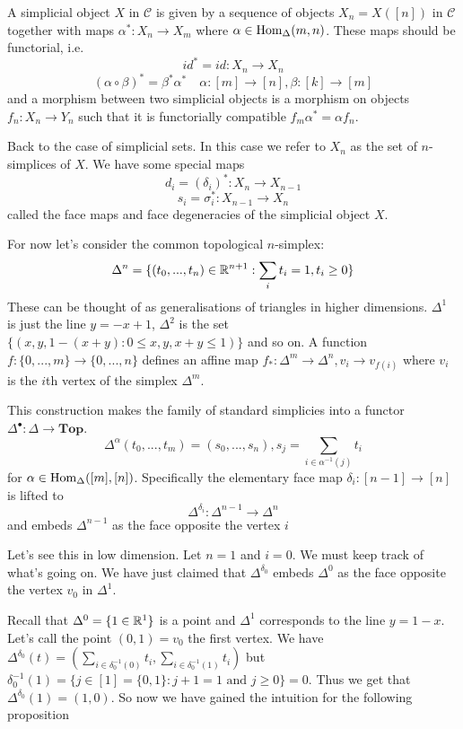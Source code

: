 A simplicial object $X$ in $\mathcal{C}$ is given by a sequence of objects $X_n = X([n])$ in $\mathcal{C}$ together with maps $\alpha^*: X_n \to X_m$ where $\alpha \in \text{Hom}_\Delta(m, n)$. These maps should be functorial, i.e. 
\[id^* = id : X_n \to X_n\]
\[(\alpha \circ \beta)^* = \beta^* \alpha^*\quad \alpha: [m]\to [n], \beta: [k]\to [m]\]
and a morphism between two simplicial objects is a morphism on objects $f_n: X_n \to Y_n$ such that it is functorially compatible $f_m \alpha^* = \alpha f_n$. 

Back to the case of simplicial sets. In this case we refer to $X_n$ as the set of $n$-simplices of $X$. We have some special maps
\[d_i = (\delta_i)^*: X_n\to X_{n-1}\]
\[s_i = \sigma_i^*: X_{n-1}\to X_n\]
called the face maps and face degeneracies of the simplicial object $X$. 

For now let's consider the common topological $n$-simplex:
\[\Delta^n = \{(t_0,...,t_n)\in \mathbb{R}^{n+1}: \sum_it_i = 1, t_i \geq 0\}\]
These can be thought of as generalisations of triangles in higher dimensions. $\Delta^1$ is just the line $y = -x + 1$, $\Delta^2$ is the set $\{(x,y,1 - (x + y): 0\leq x,y, x + y \leq 1)\}$ and so on. A function $f: \{0,...,m\}\to \{0,...,n\}$ defines an affine map $f_*: \Delta^m \to \Delta^n, v_i \to v_{f(i)}$ where $v_i$ is the $i$th vertex of the simplex $\Delta^m$. 

This construction makes the family of standard simplicies into a functor $\Delta^\bullet: \Delta \to \textbf{Top}$.
\[\Delta^\alpha(t_0,...,t_m) = (s_0,...,s_n), s_j = \sum_{i \in \alpha^{-1}(j)}t_i\]
for $\alpha\in \text{Hom}_{\Delta}([m], [n])$. Specifically the elementary face map $\delta_i: [n-1]\to[n]$ is lifted to
\[\Delta^{\delta_i}: \Delta^{n-1}\to \Delta^n\]
and embeds $\Delta^{n-1}$ as the face opposite the vertex $i$ 

Let's see this in low dimension. Let $n = 1$ and $i= 0$. We must keep track of what's going on. We have just claimed that $\Delta^{\delta_0}$ embeds $\Delta^0$ as the face opposite the vertex $v_0$ in $\Delta^1$.

Recall that $\Delta^0 = \{1 \in \mathbb{R}^1\}$ is a point and $\Delta^1$ corresponds to the line $y = 1 - x$. Let's call the point $(0,1) = v_0$ the first vertex. We have $\Delta^{\delta_0} (t) = (\sum_{i \in \delta_0^{-1}(0)}t_i,\sum_{i \in \delta_0^{-1}(1)}t_i)$ but $\delta_0^{-1}(1) = \{j \in [1] = \{0,1\}: j + 1 = 1 \text{ and } j \geq 0\} = 0$. Thus we get that $\Delta^{\delta_0} (1) = (1,0)$. So now we have gained the intuition for the following proposition

